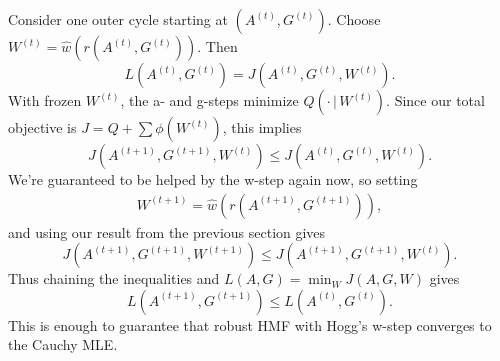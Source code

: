 \documentclass[onecolumn,floatfix]{aastex631}
\begin{document}
Consider one outer cycle starting at $(A^{(t)}, G^{(t)})$.  
Choose $W^{(t)} = \hat{w}(r(A^{(t)},G^{(t)}))$.  
Then
\begin{equation}
    L(A^{(t)}, G^{(t)}) = J(A^{(t)}, G^{(t)}, W^{(t)}).
\end{equation}
With frozen $W^{(t)}$, the a- and g-steps minimize $Q(\cdot \,| \,W^{(t)})$.
Since our total objective is $J = Q + \sum \phi(W^{(t)})$, this implies
\begin{equation}    
    J(A^{(t+1)}, G^{(t+1)}, W^{(t)}) \le J(A^{(t)}, G^{(t)}, W^{(t)}).
\end{equation}
We're guaranteed to be helped by the w-step again now, so setting
\begin{align}
    W^{(t+1)} = \hat{w} \left( r(A^{(t+1)}, G^{(t+1)}) \right),
\end{align}
and using our result from the previous section gives
\begin{equation}
    J(A^{(t+1)}, G^{(t+1)}, W^{(t+1)}) \le J(A^{(t+1)}, G^{(t+1)}, W^{(t)}).
\end{equation}
Thus chaining the inequalities and $L(A,G) = \min_W J(A, G, W)$ gives
\begin{equation}
    L(A^{(t+1)}, G^{(t+1)}) \le L(A^{(t)}, G^{(t)}).
\end{equation}
This is enough to guarantee that robust HMF with Hogg's w-step converges to the Cauchy MLE.

\end{document}
